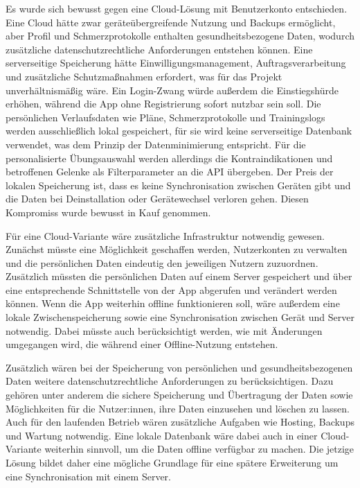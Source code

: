 Es wurde sich bewusst gegen eine Cloud-Lösung mit Benutzerkonto entschieden. Eine Cloud hätte zwar geräteübergreifende Nutzung und Backups ermöglicht, aber Profil und Schmerzprotokolle enthalten gesundheitsbezogene Daten, wodurch zusätzliche datenschutzrechtliche Anforderungen entstehen können. Eine serverseitige Speicherung hätte Einwilligungsmanagement, Auftragsverarbeitung und zusätzliche Schutzmaßnahmen erfordert, was für das Projekt unverhältnismäßig wäre. Ein Login-Zwang würde außerdem die Einstiegshürde erhöhen, während die App ohne Registrierung sofort nutzbar sein soll. Die persönlichen Verlaufsdaten wie Pläne, Schmerzprotokolle und Trainingslogs werden ausschließlich lokal gespeichert, für sie wird keine serverseitige Datenbank verwendet, was dem Prinzip der Datenminimierung entspricht. Für die personalisierte Übungsauswahl werden allerdings die Kontraindikationen und betroffenen Gelenke als Filterparameter an die API übergeben. Der Preis der lokalen Speicherung ist, dass es keine Synchronisation zwischen Geräten gibt und die Daten bei Deinstallation oder Gerätewechsel verloren gehen. Diesen Kompromiss wurde bewusst in Kauf genommen.

Für eine Cloud-Variante wäre zusätzliche Infrastruktur notwendig gewesen. Zunächst müsste eine Möglichkeit geschaffen werden, Nutzerkonten zu verwalten und die persönlichen Daten eindeutig den jeweiligen Nutzern zuzuordnen. Zusätzlich müssten die persönlichen Daten auf einem Server gespeichert und über eine entsprechende Schnittstelle von der App abgerufen und verändert werden können. Wenn die App weiterhin offline funktionieren soll, wäre außerdem eine lokale Zwischenspeicherung sowie eine Synchronisation zwischen Gerät und Server notwendig. Dabei müsste auch berücksichtigt werden, wie mit Änderungen umgegangen wird, die während einer Offline-Nutzung entstehen.

Zusätzlich wären bei der Speicherung von persönlichen und gesundheitsbezogenen Daten weitere datenschutzrechtliche Anforderungen zu berücksichtigen. Dazu gehören unter anderem die sichere Speicherung und Übertragung der Daten sowie Möglichkeiten für die Nutzer:innen, ihre Daten einzusehen und löschen zu lassen. Auch für den laufenden Betrieb wären zusätzliche Aufgaben wie Hosting, Backups und Wartung notwendig. Eine lokale Datenbank wäre dabei auch in einer Cloud-Variante weiterhin sinnvoll, um die Daten offline verfügbar zu machen. Die jetzige Lösung bildet daher eine mögliche Grundlage für eine spätere Erweiterung um eine Synchronisation mit einem Server.

